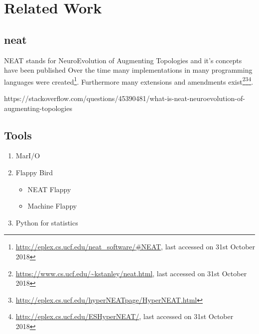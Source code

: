 %
\chapter{Related Work}
\label{sec:related}

\section{\gls{neat}}
\label{sec:related:neat}
	NEAT stands for NeuroEvolution of Augmenting Topologies and it's concepts have been published 
	Over the time many implementations in many programming languages were created\footnote{\url{http://eplex.cs.ucf.edu/neat_software/#NEAT}, last accessed on 31st October 2018}. Furthermore many extensions and amendments exist\footnote{\url{https://www.cs.ucf.edu/~kstanley/neat.html}, last accessed on 31st October 2018}\footnote{\url{http://eplex.cs.ucf.edu/hyperNEATpage/HyperNEAT.html}}\footnote{\url{http://eplex.cs.ucf.edu/ESHyperNEAT/}, last accessed on 31st October 2018}.

https://stackoverflow.com/questions/45390481/what-is-neat-neuroevolution-of-augmenting-topologies


\section{Tools}
\label{sec:related:tools}

\begin{enumerate}
	\item MarI/O
	\item Flappy Bird
	\begin{itemize}
		\item NEAT Flappy
		\item Machine Flappy
	\end{itemize}
	\item Python for statistics
\end{enumerate}

